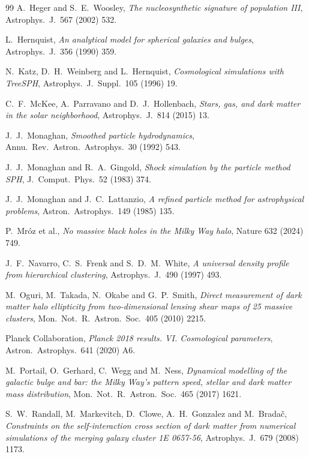 \documentclass[11pt]{article}
\theoremstyle{definition}
\begin{document}
\begin{thebibliography}{99}
A.~Heger and S.~E.~Woosley,
\emph{The nucleosynthetic signature of population III},
Astrophys.\ J.\ 567 (2002) 532.

L.~Hernquist,
\emph{An analytical model for spherical galaxies and bulges},
Astrophys.\ J.\ 356 (1990) 359.

N.~Katz, D.~H.~Weinberg and L.~Hernquist,
\emph{Cosmological simulations with TreeSPH},
Astrophys.\ J.\ Suppl.\ 105 (1996) 19.

C.~F.~McKee, A.~Parravano and D.~J.~Hollenbach,
\emph{Stars, gas, and dark matter in the solar neighborhood},
Astrophys.\ J.\ 814 (2015) 13.

J.~J.~Monaghan,
\emph{Smoothed particle hydrodynamics},
Annu.\ Rev.\ Astron.\ Astrophys.\ 30 (1992) 543.

J.~J.~Monaghan and R.~A.~Gingold,
\emph{Shock simulation by the particle method SPH},
J.\ Comput.\ Phys.\ 52 (1983) 374.

J.~J.~Monaghan and J.~C.~Lattanzio,
\emph{A refined particle method for astrophysical problems},
Astron.\ Astrophys.\ 149 (1985) 135.

P.~Mr\'oz et al.,
\emph{No massive black holes in the Milky Way halo},
Nature 632 (2024) 749.

J.~F.~Navarro, C.~S.~Frenk and S.~D.~M.~White,
\emph{A universal density profile from hierarchical clustering},
Astrophys.\ J.\ 490 (1997) 493.

M.~Oguri, M.~Takada, N.~Okabe and G.~P.~Smith,
\emph{Direct measurement of dark matter halo ellipticity from two-dimensional lensing shear maps of 25 massive clusters},
Mon.\ Not.\ R.\ Astron.\ Soc.\ 405 (2010) 2215.

Planck Collaboration,
\emph{Planck 2018 results. VI. Cosmological parameters},
Astron.\ Astrophys.\ 641 (2020) A6.

M.~Portail, O.~Gerhard, C.~Wegg and M.~Ness,
\emph{Dynamical modelling of the galactic bulge and bar: the Milky Way's pattern speed, stellar and dark matter mass distribution},
Mon.\ Not.\ R.\ Astron.\ Soc.\ 465 (2017) 1621.

S.~W.~Randall, M.~Markevitch, D.~Clowe, A.~H.~Gonzalez and M.~Brada\v{c},
\emph{Constraints on the self-interaction cross section of dark matter from numerical simulations of the merging galaxy cluster 1E 0657-56},
Astrophys.\ J.\ 679 (2008) 1173.


\end{thebibliography}
\end{document}
